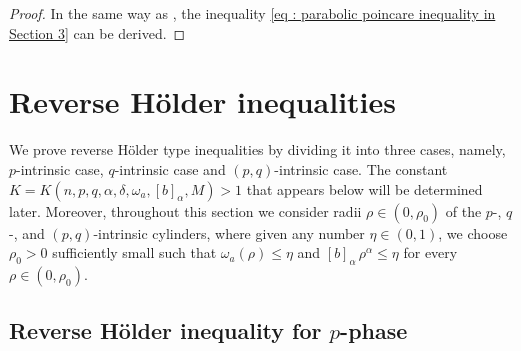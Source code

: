 \documentclass[11pt,oneside, english,reqno,twoside a4paper]{amsart}
\theoremstyle{definition}
\numberwithin{theorem}{section}
\numberwithin{equation}{section}
\begin{document}
\begin{proof}
    In the same way as \cite[~2.5]{2023_Gradient_Higher_Integrability_for_Degenerate_Parabolic_Double-Phase_Systems}, the inequality \eqref{eq : parabolic poincare inequality in Section 3} can be derived.
\end{proof}




\section{Reverse H\"{o}lder inequalities}\label{Sec:Reverse_H}

We prove reverse H\"{o}lder type inequalities by dividing it into three cases, namely, $p$-intrinsic case, $q$-intrinsic case and $(p,q)$-intrinsic case.
The constant $K=K(n,p, q, \alpha, \delta, \omega_a,  [b]_\alpha, M)>1$ that appears below will be determined later. Moreover, throughout this section we consider radii $\rho\in(0,\rho_0)$ of the $p$-, $q$-, and $(p,q)$-intrinsic cylinders, where given any number $\eta \in (0,1)$, we choose $\rho_0>0$ sufficiently small such that $\omega_a(\rho)\le \eta$ and $[b]_\alpha\,\rho^\alpha \le \eta$ for every $\rho\in(0,\rho_0)$.

\subsection{Reverse H\"older inequality for $p$-phase}
\end{document}
